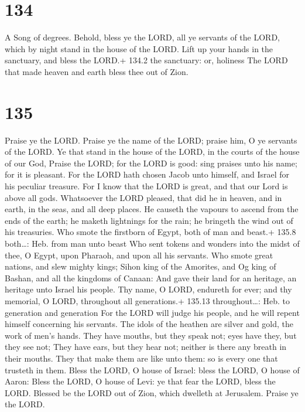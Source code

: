 \hypertarget{section-134}{%
\section{134}\label{section-134}}

A Song of degrees.  Behold, bless ye the LORD, all ye
servants of the LORD, which by night stand in the house of the LORD.
 Lift up your hands in the sanctuary, and bless the LORD.+
134.2 the sanctuary: or, holiness  The LORD that made heaven
and earth bless thee out of Zion.

\hypertarget{section-135}{%
\section{135}\label{section-135}}

 Praise ye the LORD. Praise ye the name of the LORD; praise
him, O ye servants of the LORD.  Ye that stand in the house
of the LORD, in the courts of the house of our God,  Praise
the LORD; for the LORD is good: sing praises unto his name; for it is
pleasant.  For the LORD hath chosen Jacob unto himself, and
Israel for his peculiar treasure.  For I know that the LORD
is great, and that our Lord is above all gods.  Whatsoever
the LORD pleased, that did he in heaven, and in earth, in the seas, and
all deep places.  He causeth the vapours to ascend from the
ends of the earth; he maketh lightnings for the rain; he bringeth the
wind out of his treasuries.  Who smote the firstborn of
Egypt, both of man and beast.+ 135.8 both\ldots: Heb. from man unto
beast  Who sent tokens and wonders into the midst of thee, O
Egypt, upon Pharaoh, and upon all his servants.  Who smote
great nations, and slew mighty kings;  Sihon king of the
Amorites, and Og king of Bashan, and all the kingdoms of Canaan:
 And gave their land for an heritage, an heritage unto
Israel his people.  Thy name, O LORD, endureth for ever;
and thy memorial, O LORD, throughout all generations.+ 135.13
throughout\ldots: Heb. to generation and generation  For
the LORD will judge his people, and he will repent himself concerning
his servants.  The idols of the heathen are silver and
gold, the work of men's hands.  They have mouths, but they
speak not; eyes have they, but they see not;  They have
ears, but they hear not; neither is there any breath in their mouths.
 They that make them are like unto them: so is every one
that trusteth in them.  Bless the LORD, O house of Israel:
bless the LORD, O house of Aaron:  Bless the LORD, O house
of Levi: ye that fear the LORD, bless the LORD.  Blessed be
the LORD out of Zion, which dwelleth at Jerusalem. Praise ye the LORD.

